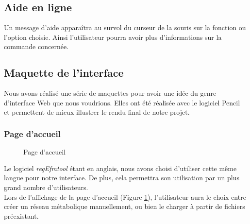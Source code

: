 \subsection{Aide en ligne}
Un message d'aide apparaîtra au survol du curseur de la souris sur la fonction ou l'option choisie. Ainsi l'utilisateur pourra avoir plus d'informations sur la commande concernée.

\subsection{Maquette de l'interface}
Nous avons réalisé une série de maquettes pour avoir une idée du genre d'interface Web que nous voudrions. Elles ont été réalisée avec le logiciel Pencil~\cite{pencil:url} et permettent de mieux illustrer le rendu final de notre projet.

\subsubsection{Page d'accueil}

\begin{figure}[!ht]
	\begin{center}
		\caption{Page d'accueil}
  		\label{main}
  	\end{center}	
\end{figure}

Le logiciel \textit{regEfmtool} étant en anglais, nous avons choisi d'utiliser cette même langue pour notre interface. De plus, cela permettra son utilisation par un plus grand nombre d'utilisateurs. \\
			Lors de l'affichage de la page d'accueil (Figure \ref{main}), l'utilisateur aura le choix entre créer un réseau métabolique manuellement, ou bien le charger à partir de fichiers préexistant. 
			
